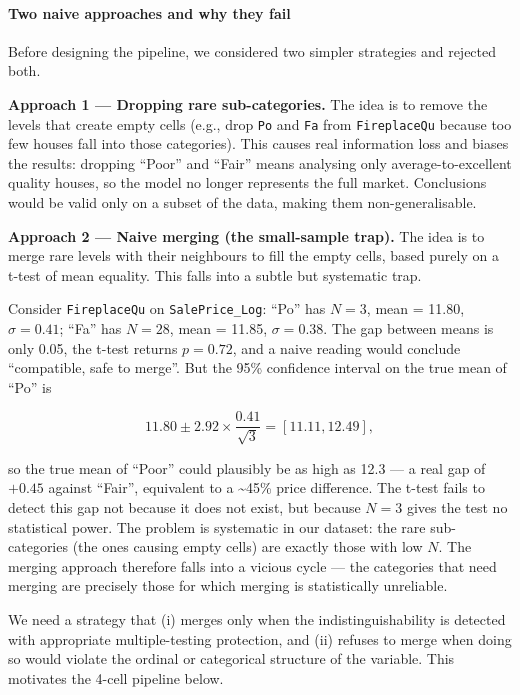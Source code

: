 \paragraph{Two naive approaches and why they
fail}\label{two-naive-approaches-and-why-they-fail}

Before designing the pipeline, we considered two simpler strategies and
rejected both.

\textbf{Approach 1 --- Dropping rare sub-categories.} The idea is to
remove the levels that create empty cells (e.g., drop \texttt{Po} and
\texttt{Fa} from \texttt{FireplaceQu} because too few houses fall into
those categories). This causes real information loss and biases the
results: dropping ``Poor'' and ``Fair'' means analysing only
average-to-excellent quality houses, so the model no longer represents
the full market. Conclusions would be valid only on a subset of the
data, making them non-generalisable.

\textbf{Approach 2 --- Naive merging (the small-sample trap).} The idea
is to merge rare levels with their neighbours to fill the empty cells,
based purely on a t-test of mean equality. This falls into a subtle but
systematic trap.

Consider \texttt{FireplaceQu} on \texttt{SalePrice\_Log}: ``Po'' has
\(N = 3\), mean = 11.80, \(\sigma = 0.41\); ``Fa'' has \(N = 28\), mean
= 11.85, \(\sigma = 0.38\). The gap between means is only 0.05, the
t-test returns \(p = 0.72\), and a naive reading would conclude
``compatible, safe to merge''. But the 95\% confidence interval on the
true mean of ``Po'' is

\[11.80 \pm 2.92 \times \frac{0.41}{\sqrt{3}} = [11.11, 12.49],\]

so the true mean of ``Poor'' could plausibly be as high as 12.3 --- a
real gap of \(+0.45\) against ``Fair'', equivalent to a
\textasciitilde45\% price difference. The t-test fails to detect this
gap not because it does not exist, but because \(N = 3\) gives the test
no statistical power. The problem is systematic in our dataset: the rare
sub-categories (the ones causing empty cells) are exactly those with low
\(N\). The merging approach therefore falls into a vicious cycle --- the
categories that need merging are precisely those for which merging is
statistically unreliable.

We need a strategy that (i) merges only when the indistinguishability is
detected with appropriate multiple-testing protection, and (ii) refuses
to merge when doing so would violate the ordinal or categorical
structure of the variable. This motivates the 4-cell pipeline below.

